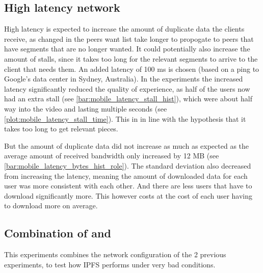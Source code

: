 
\subsection{High latency network}
\label{sec:eval_high_latency}
High latency is expected to increase the amount of duplicate data the clients receive, as changed in the peers want list take longer to propogate to peers that have segments that are no longer wanted. It could potentially also increase the amount of stalls, since it takes too long for the relevant segments to arrive to the client that needs them. An added latency of 100 \acs{ms} is chosen (based on a ping to Google's data center in Sydney, Australia).
In the experiments the increased latency significantly reduced the quality of experience, as half of the users now had an extra stall (see \autoref{bar:mobile_latency_stall_hist}), which were about half way into the video and lasting multiple seconds (see \autoref{plot:mobile_latency_stall_time}). This in in line with the hypothesis that it takes too long to get relevant pieces.


But the amount of duplicate data did not increase as much as expected as the average amount of received bandwidth only increased by 12 \ac{MB} (see \autoref{bar:mobile_latency_bytes_hist_role}). The standard deviation also decreased from increasing the latency, meaning the amount of downloaded data for each user was more consistent with each other. And there are less users that have to download significantly more. This however costs at the cost of each user having to download more on average.




\subsection{Combination of  and }
This experiments combines the network configuration of the 2 previous experiments, to test how \ac{IPFS} performs under very bad conditions.



